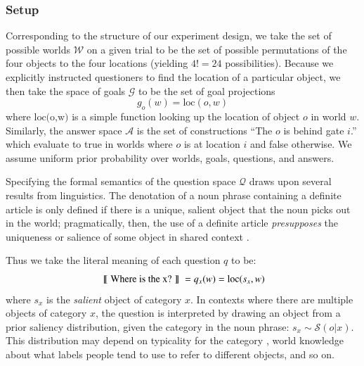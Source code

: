 \documentclass[12pt, floatsintext, jou]{apa6}
\newcommand{\den}[2][]{
\(
\left\llbracket\;\text{#2}\;\right\rrbracket^{#1}
\)
}
\begin{document}

\subsubsection{Setup} 
Corresponding to the structure of our experiment design, we take the set of possible worlds $\mathcal{W}$ on a given trial to be the set of possible permutations of the four objects to the four locations (yielding $4! = 24$ possibilities). 
Because we explicitly instructed questioners to find the location of a particular object, we then take the space of goals $\mathcal{G}$ to be the set of goal projections $$g_o(w) = \textrm{loc}(o,w)$$ where $\textrm{loc(o,w)}$ is a simple function looking up the location of object $o$ in world $w$. 
Similarly, the answer space $\mathcal{A}$ is the set of constructions ``The $o$ is behind gate $i$.'' which evaluate to true in worlds where $o$ is at location $i$ and false otherwise.
We assume uniform prior probability over worlds, goals, questions, and answers. 

Specifying the formal semantics of the question space $\mathcal{Q}$ draws upon several results from linguistics. 
The denotation of a noun phrase containing a definite article is only defined if there is a unique, salient object that the noun picks out in the world; pragmatically, then, the use of a definite article \emph{presupposes} the uniqueness or salience of some object in shared context \cite{Lewis79_Scorekeeping, clark1983common, Roberts03_UniquenessDefiniteNounPhrases}. 

Thus we take the literal meaning of each question $q$ to be: 
$$\textrm{\den{Where is the x?}} = q_{x}(w) = \textrm{loc}(s_x,w)$$ where $s_x$ is the \emph{salient} object of category $x$. 
In contexts where there are multiple objects of category $x$, the question is interpreted by drawing an object from a prior saliency distribution, given the category in the noun phrase: $s_x \sim \mathcal{S}(o | x)$. 
This distribution may depend on typicality for the category \cite{Rosch75}, world knowledge about what labels people tend to use to refer to different objects, and so on. 
\end{document}
